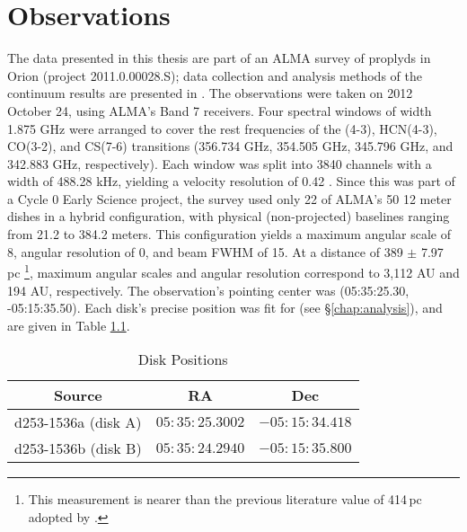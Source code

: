 \chapter{Observations}
\label{chap:observations}




The data presented in this thesis are part of an ALMA survey of proplyds in Orion (project 2011.0.00028.S); data collection and analysis methods of the continuum results are presented in \citet{Mann2014}. The observations were taken on 2012 October 24, using ALMA's Band 7 receivers. Four spectral windows of width 1.875 GHz were arranged to cover the rest frequencies of the \hco(4-3), HCN(4-3), CO(3-2), and CS(7-6) transitions (356.734 GHz, 354.505 GHz, 345.796 GHz, and 342.883 GHz, respectively). Each window was split into 3840 channels with a width of 488.28 kHz, yielding a velocity resolution of 0.42 \kms. Since this was part of a Cycle 0 Early Science project, the survey used only 22 of ALMA's 50 12 meter dishes in a hybrid configuration, with physical (non-projected) baselines ranging from 21.2 to 384.2 meters. This configuration yields a maximum angular scale of 8\arcsec, angular resolution of 0, and beam FWHM of 15\arcsec. At a distance of 389 $\pm$ 7.97 pc \citep{GaiaCollaboration2016,GaiaCollaboration2018}\footnote{This measurement is nearer than the previous literature value of 414\,pc adopted by \citep{Factor2017}.}, maximum angular scales and angular resolution correspond to 3,112 AU and 194 AU, respectively. The observation's pointing center was (05:35:25.30, -05:15:35.50). Each disk's precise position was fit for (see \S\ref{chap:analysis}), and are given in Table \ref{table:disk_positions}.

\begin{table}
  \centering
  \caption{Disk Positions}
  \label{table:disk_positions}
  \renewcommand{\arraystretch}{1.2}
  \begin{tabular}{c | c | c }
    \toprule \toprule
      Source      &  RA            & Dec \\
    \midrule %
      d253-1536a (disk A)  &  $05:35:25.3002$ & $-05:15:34.418$  \\
      d253-1536b (disk B)  &  $05:35:24.2940$ & $-05:15:35.800$  \\
    \bottomrule
  \end{tabular}
\end{table}

